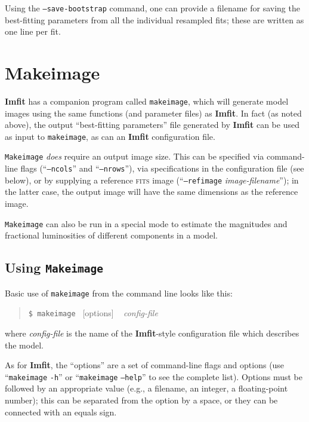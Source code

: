 \documentclass[10pt,a4paper,article]{memoir}
\newcommand{\imfit}{\textbf{Imfit}}
\newcommand{\Imfit}{\textbf{Imfit}}
\newcommand{\makeimage}{\texttt{makeimage}}
\newcommand{\Makeimage}{\texttt{Makeimage}}
\begin{document}
Using the \texttt{--save-bootstrap} command, one can provide a filename
for saving the best-fitting parameters from all the individual resampled
fits; these are written as one line per fit.



\chapter{Makeimage}

\Imfit{} has a companion program called \makeimage, which will generate model
images using the same functions (and parameter files) as \imfit. In fact (as
noted above), the output ``best-fitting parameters'' file generated by \imfit{}
can be used as input to \makeimage, as can an \imfit{} configuration file.

\Makeimage{} \textit{does} require an output image size.  This can be specified
via command-line flags (``\texttt{--ncols}'' and ``\texttt{--nrows}''), via
specifications in the configuration file (see below), or by supplying a
reference \textsc{fits} image (``\texttt{--refimage} \textit{image-filename}''); in the
latter case, the output image will have the same dimensions as the reference
image.

\Makeimage{} can also be run in a special mode to estimate the
magnitudes and fractional luminosities of different components in a
model.


\section{Using \Makeimage{}}

Basic use of \makeimage{} from the command line looks like this:
\begin{quote}
  \texttt{\$ \makeimage{} }  [options] ~ \textit{config-file}
\end{quote}
where \textit{config-file} is the name of the \imfit{}-style configuration file
which describes the model.

As for \imfit, the ``options'' are a set of command-line flags and
options (use ``\makeimage{} \texttt{-h}'' or ``\makeimage{} \texttt{--help}'' to
see the complete list). Options must be followed by an appropriate value
(e.g., a filename, an integer, a floating-point number); this can be
separated from the option by a space, or they can be connected with an
equals sign.

\bigskip
\end{document}
